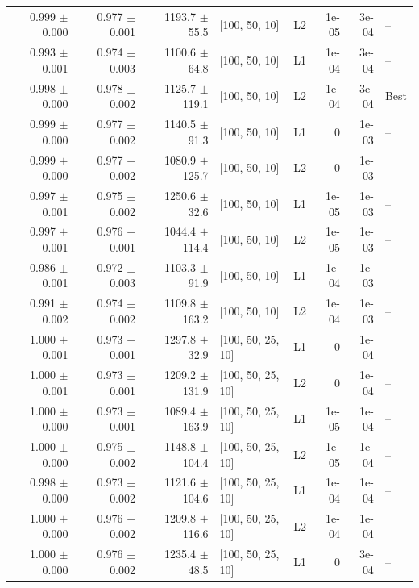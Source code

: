\documentclass[reprint,english,notitlepage, floatfix]{revtex4-2}  %
\begin{document}
\begin{longtable}{r r r l l r r l}
\rowcolor{Cluster4} 0.999 $\pm$ 0.000 & 0.977 $\pm$ 0.001 & 1193.7 $\pm$ 55.5 & [100, 50, 10] & L2 & 1e-05 & 3e-04 & -- \\
\rowcolor{Cluster4} 0.993 $\pm$ 0.001 & 0.974 $\pm$ 0.003 & 1100.6 $\pm$ 64.8 & [100, 50, 10] & L1 & 1e-04 & 3e-04 & -- \\
\rowcolor{Cluster4} 0.998 $\pm$ 0.000 & 0.978 $\pm$ 0.002 & 1125.7 $\pm$ 119.1 & [100, 50, 10] & L2 & 1e-04 & 3e-04 & Best \\
\rowcolor{Cluster4} 0.999 $\pm$ 0.000 & 0.977 $\pm$ 0.002 & 1140.5 $\pm$ 91.3 & [100, 50, 10] & L1 & 0 & 1e-03 & -- \\
\rowcolor{Cluster4} 0.999 $\pm$ 0.000 & 0.977 $\pm$ 0.002 & 1080.9 $\pm$ 125.7 & [100, 50, 10] & L2 & 0 & 1e-03 & -- \\
\rowcolor{Cluster4} 0.997 $\pm$ 0.001 & 0.975 $\pm$ 0.002 & 1250.6 $\pm$ 32.6 & [100, 50, 10] & L1 & 1e-05 & 1e-03 & -- \\
\rowcolor{Cluster4} 0.997 $\pm$ 0.001 & 0.976 $\pm$ 0.001 & 1044.4 $\pm$ 114.4 & [100, 50, 10] & L2 & 1e-05 & 1e-03 & -- \\
\rowcolor{Cluster4} 0.986 $\pm$ 0.001 & 0.972 $\pm$ 0.003 & 1103.3 $\pm$ 91.9 & [100, 50, 10] & L1 & 1e-04 & 1e-03 & -- \\
\rowcolor{Cluster4} 0.991 $\pm$ 0.002 & 0.974 $\pm$ 0.002 & 1109.8 $\pm$ 163.2 & [100, 50, 10] & L2 & 1e-04 & 1e-03 & -- \\
\rowcolor{Cluster4} 1.000 $\pm$ 0.001 & 0.973 $\pm$ 0.001 & 1297.8 $\pm$ 32.9 & [100, 50, 25, 10] & L1 & 0 & 1e-04 & -- \\
\rowcolor{Cluster4} 1.000 $\pm$ 0.001 & 0.973 $\pm$ 0.001 & 1209.2 $\pm$ 131.9 & [100, 50, 25, 10] & L2 & 0 & 1e-04 & -- \\
\rowcolor{Cluster4} 1.000 $\pm$ 0.000 & 0.973 $\pm$ 0.001 & 1089.4 $\pm$ 163.9 & [100, 50, 25, 10] & L1 & 1e-05 & 1e-04 & -- \\
\rowcolor{Cluster4} 1.000 $\pm$ 0.000 & 0.975 $\pm$ 0.002 & 1148.8 $\pm$ 104.4 & [100, 50, 25, 10] & L2 & 1e-05 & 1e-04 & -- \\
\rowcolor{Cluster4} 0.998 $\pm$ 0.000 & 0.973 $\pm$ 0.002 & 1121.6 $\pm$ 104.6 & [100, 50, 25, 10] & L1 & 1e-04 & 1e-04 & -- \\
\rowcolor{Cluster4} 1.000 $\pm$ 0.000 & 0.976 $\pm$ 0.002 & 1209.8 $\pm$ 116.6 & [100, 50, 25, 10] & L2 & 1e-04 & 1e-04 & -- \\
\rowcolor{Cluster4} 1.000 $\pm$ 0.000 & 0.976 $\pm$ 0.002 & 1235.4 $\pm$ 48.5 & [100, 50, 25, 10] & L1 & 0 & 3e-04 & -- \\

\end{longtable}
\end{document}
